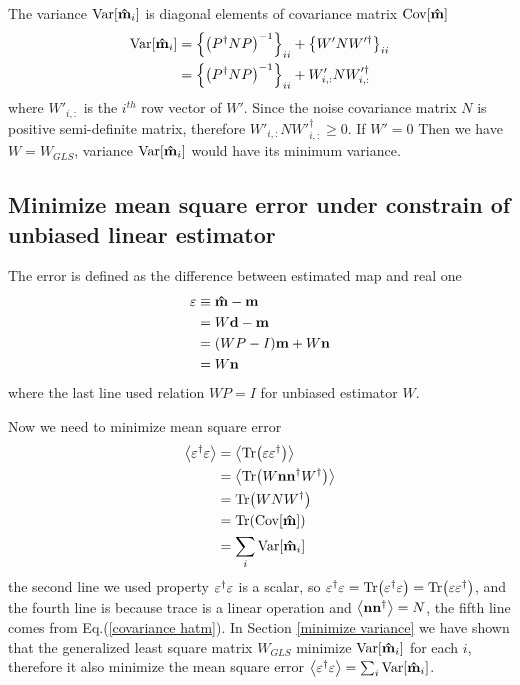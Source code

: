 \documentclass[11pt, letterpaper]{article}
\newcommand{\Var}[1]{\text{Var}\qty[#1]}
\newcommand{\Cov}[1]{\text{Cov}\qty[#1]}
\newcommand{\vbd}{\vb{d}}
\newcommand{\vbm}{\vb{m}}
\newcommand{\vbep}{\vb{\varepsilon}}
\newcommand{\vbn}{\vb{n}}
\newcommand{\inv}[1]{#1^{-1}}
\newcommand{\hatm}{\vb{\hat{m}}}
\newcommand{\Pdagger}{P^{\dagger}}
\newcommand{\PPinv}[1]{\inv{\qty(\Pdagger #1 P)}}
\begin{document}
The variance $\Var{\hatm_i}$ is diagonal elements of covariance matrix
$\Cov{\hatm}$
\begin{align}
\begin{aligned}[b]
\Var{\hatm_i}
&= \qty\Big{ \PPinv{N}}_{ii} + \qty\big{W' N W'^{\dagger}}_{ii}
\\
&= \qty\Big{ \PPinv{N}}_{ii} + W'_{i,:} N W'^{\dagger}_{i,:}
\end{aligned}
\end{align}
where $W'_{i,:}$ is the $i^{th}$ row vector of $W'$.
Since the noise covariance matrix $N$ is positive semi-definite matrix,
therefore $W'_{i,:} N W'^{\dagger}_{i,:} \geq 0$.
If $W' = 0$ Then we have $W = W_{GLS}$, variance $\Var{\hatm_i}$ would have 
its minimum variance. 

\subsection{Minimize mean square error under constrain of unbiased linear 
estimator}
The error is defined as the difference between estimated map and real one
\begin{align}
\begin{aligned}[b]
\vbep &\equiv \hatm - \vbm
\\
&= W\vbd - \vbm
\\
&= (WP-I)\vbm + W\vbn
\\
&= W\vbn
\end{aligned}
\end{align}
where the last line used relation $WP=I$ for unbiased estimator $W$. 

Now we need to minimize mean square error
\begin{align}
\begin{aligned}[b]
\ev{\vbep^{\dagger} \vbep }
&= \ev{\Tr(\vbep \vbep^{\dagger})}
\\
&=\ev{\Tr(W\vbn \vbn^{\dagger} W^{\dagger}) }
\\
&= \Tr(W N W^{\dagger})
\\
&= \Tr(\Cov{\hatm})\\
&= \sum_i \Var{\hatm_i}
\end{aligned}
\end{align}
the second line we used property $\vbep^{\dagger} \vbep$ is a scalar,
so $\vbep^{\dagger} \vbep = \Tr(\vbep^{\dagger} \vbep) 
= \Tr(\vbep \vbep^{\dagger})$,
and the fourth line is because trace is a linear operation 
and $\ev{\vbn \vbn^{\dagger} } = N$, 
the fifth line comes from Eq.(\ref{covariance hatm}).
In Section \ref{minimize variance} we have shown that the generalized least 
square matrix $W_{GLS}$ minimize $\Var{\hatm_i}$ for each $i$, 
therefore it also minimize the mean square error
$\ev{\vbep^{\dagger} \vbep} = \sum_i \Var{\hatm_i}$. 
\end{document}
